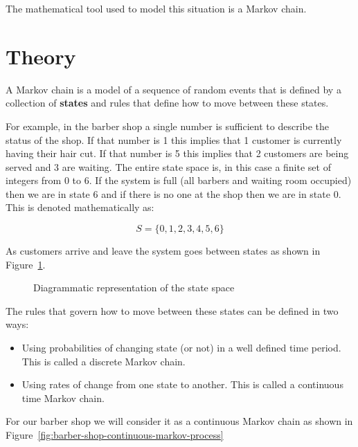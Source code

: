 The mathematical tool used to model this situation is a Markov chain.

\section{Theory}\label{sec:theory}

A Markov chain is a model of a sequence of random events that is defined by a
collection of \textbf{states} and rules that define how to move between these
states.

For example, in the barber shop a single number is sufficient to describe the
status of the shop. If that number is 1 this implies that 1 customer is
currently having their hair cut. If that number is 5 this implies that 2
customers are being served and 3 are waiting. The entire state space is, in this
case a finite set of integers from 0 to 6. If the system is full (all barbers
and waiting room occupied) then we are in state 6 and if there is no one at the
shop then we are in state 0. This is denoted mathematically as:

\begin{equation}
    S = \{0, 1, 2, 3, 4, 5, 6\}
    \label{eqn:barber_shop_state_space}
\end{equation}

As customers arrive and leave the system goes between states as shown in
Figure~\ref{fig:barber-shop-birth-death-no-rates}.

\begin{figure}[!hbtp]
    \begin{center}
    
    \end{center}
    \caption{Diagrammatic representation of the state space}
    \label{fig:barber-shop-birth-death-no-rates}
\end{figure}

The rules that govern how to move between these states can be defined in two
ways:

\begin{itemize}
    \item Using probabilities of changing state (or not) in a well defined time
        period.  This is called a discrete Markov chain.
    \item Using rates of change from one state to another. This is called a
        continuous time Markov chain.
\end{itemize}

For our barber shop we will consider it as a continuous Markov chain as shown
in Figure~\ref{fig:barber-shop-continuous-markov-process}

